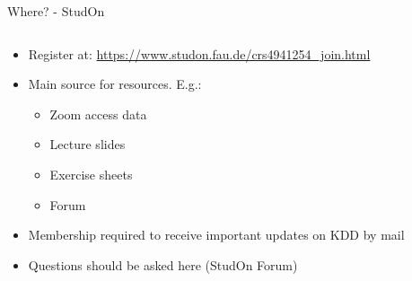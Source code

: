 \begin{frame}{Where? - StudOn}
	\begin{columns}
		\begin{column}{0.7\textwidth}
			\begin{itemize}
				\item Register at: \url{https://www.studon.fau.de/crs4941254_join.html}
				\item Main source for resources. E.g.:
				      \begin{itemize}
					      \item Zoom access data
					      \item Lecture slides
					      \item Exercise sheets
					      \item Forum
				      \end{itemize}
				\item Membership required to receive important updates on KDD by mail
				\item Questions should be asked here (StudOn Forum)

			\end{itemize}
		\end{column}
		\begin{column}{0.3\textwidth}
			\begin{center}
			\end{center}
		\end{column}
	\end{columns}

\end{frame}


